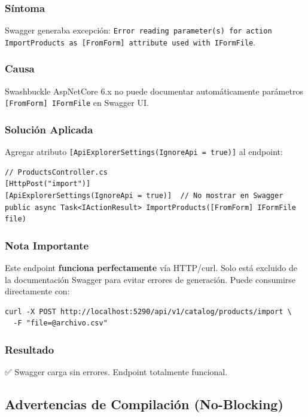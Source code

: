 \documentclass[12pt,a4paper]{article}
\begin{document}
\subsubsection{Síntoma}

Swagger generaba excepción: \texttt{Error reading parameter(s) for action ImportProducts as [FromForm] attribute used with IFormFile}.

\subsubsection{Causa}

Swashbuckle AspNetCore 6.x no puede documentar automáticamente parámetros \texttt{[FromForm] IFormFile} en Swagger UI.

\subsubsection{Solución Aplicada}

Agregar atributo \texttt{[ApiExplorerSettings(IgnoreApi = true)]} al endpoint:

\begin{lstlisting}
// ProductsController.cs
[HttpPost("import")]
[ApiExplorerSettings(IgnoreApi = true)]  // No mostrar en Swagger
public async Task<IActionResult> ImportProducts([FromForm] IFormFile file)
\end{lstlisting}

\subsubsection{Nota Importante}

Este endpoint \textbf{funciona perfectamente} vía HTTP/curl. Solo está excluido de la documentación Swagger para evitar errores de generación. Puede consumirse directamente con:

\begin{lstlisting}
curl -X POST http://localhost:5290/api/v1/catalog/products/import \
  -F "file=@archivo.csv"
\end{lstlisting}

\subsubsection{Resultado}

✅ Swagger carga sin errores. Endpoint totalmente funcional.

\subsection{Advertencias de Compilación (No-Blocking)}
\end{document}
